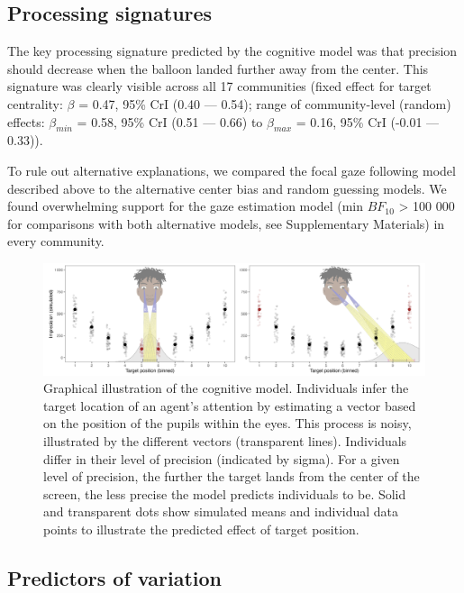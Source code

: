 \documentclass[
  man,floatsintext]{apa7}
\begin{document}
\hypertarget{processing-signatures-1}{%
\subsection{Processing signatures}\label{processing-signatures-1}}

The key processing signature predicted by the cognitive model was that precision should decrease when the balloon landed further away from the center. This signature was clearly visible across all 17 communities (fixed effect for target centrality: \(\beta\) = 0.47, 95\% CrI (0.40 --- 0.54); range of community-level (random) effects: \(\beta_{min}\) = 0.58, 95\% CrI (0.51 --- 0.66) to \(\beta_{max}\) = 0.16, 95\% CrI (-0.01 --- 0.33)).

To rule out alternative explanations, we compared the focal gaze following model described above to the alternative center bias and random guessing models. We found overwhelming support for the gaze estimation model (min \(BF_{10}\) \textgreater{} 100 000 for comparisons with both alternative models, see Supplementary Materials) in every community.

\begin{figure}
\includegraphics[width=1\linewidth]{../figures/fig1_3} \caption{Graphical illustration of the cognitive model. Individuals infer the target location of an agent’s attention by estimating a vector based on the position of the pupils within the eyes. This process is noisy, illustrated by the different vectors (transparent lines). Individuals differ in their level of precision (indicated by sigma). For a given level of precision, the further the target lands from the center of the screen, the less precise the model predicts individuals to be. Solid and transparent dots show simulated means and individual data points to illustrate the predicted effect of target position.}\label{fig:fig12}
\end{figure}

\hypertarget{predictors-of-variation-1}{%
\subsection{Predictors of variation}\label{predictors-of-variation-1}}
\end{document}
